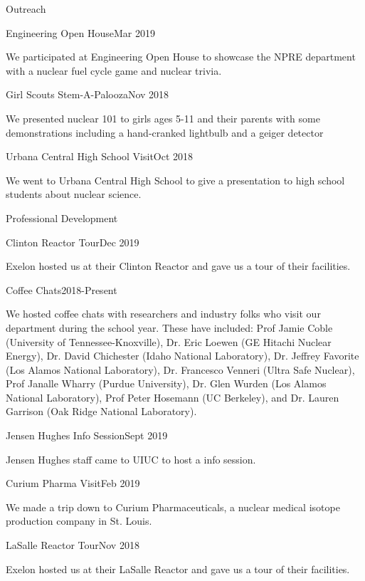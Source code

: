 \documentclass{resume2} %
\begin{document}
\begin{rSection}{Outreach}
\begin{rSubsection}{Engineering Open House}{Mar 2019}{}{}
		\item We participated at Engineering Open House to showcase
		the NPRE department with a nuclear fuel cycle game and nuclear trivia.
	\end{rSubsection}
	\begin{rSubsection}{Girl Scouts Stem-A-Palooza}{Nov 2018}{}{}
		\item We presented nuclear 101 to girls ages 5-11 and their parents with some demonstrations including a hand-cranked lightbulb   		and a geiger detector
	\end{rSubsection}
	\pagebreak
	\begin{rSubsection}{Urbana Central High School Visit}{Oct 2018}{}{}
		\item We went to Urbana Central High School to give a presentation
		to high school students about nuclear science.
	\end{rSubsection}
\end{rSection}

\begin{rSection}{Professional Development}
	\begin{rSubsection}{Clinton Reactor Tour}{Dec 2019}{}{}
		\item Exelon hosted us at their Clinton Reactor and gave us a
		tour of their facilities.
	\end{rSubsection}
	\begin{rSubsection}{Coffee Chats}{2018-Present}{}{}
		\item We hosted coffee chats with researchers and industry folks who
		visit our department during the school year. These have included:
		Prof Jamie Coble (University of Tennessee-Knoxville),
		Dr. Eric Loewen (GE Hitachi Nuclear Energy),
		Dr. David Chichester (Idaho National Laboratory),
		Dr. Jeffrey Favorite (Los Alamos National Laboratory),
		Dr. Francesco Venneri (Ultra Safe Nuclear),
		Prof Janalle Wharry (Purdue University),
		Dr. Glen Wurden (Los Alamos National Laboratory),
		Prof Peter Hosemann (UC Berkeley),
		and Dr. Lauren Garrison (Oak Ridge National Laboratory).
	\end{rSubsection}
	\begin{rSubsection}{Jensen Hughes Info Session}{Sept 2019}{}{}
		\item Jensen Hughes staff came to UIUC to host a info session.
	\end{rSubsection}
	\begin{rSubsection}{Curium Pharma Visit}{Feb 2019}{}{}
		\item We made a trip down to Curium Pharmaceuticals,
		a nuclear medical isotope production company in St. Louis.
	\end{rSubsection}
	\begin{rSubsection}{LaSalle Reactor Tour}{Nov 2018}{}{}
		\item Exelon hosted us at their LaSalle Reactor and gave us a
		tour of their facilities.
	\end{rSubsection}
\end{rSection}


\end{document}
